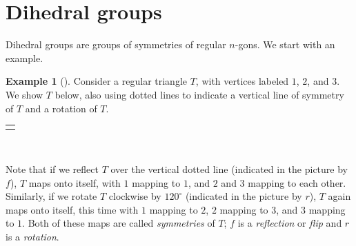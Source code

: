 \documentclass[10pt,openany,oneside]{book}
\theoremstyle{plain}
\theoremstyle{definition}
\theoremstyle{definition}
\theoremstyle{definition}
\newtheorem{example}[theorem]{Example}
\theoremstyle{definition}
\numberwithin{equation}{section}
\newlength{\panelmax}
\begin{document}
\section[{Dihedral groups}]{Dihedral groups}\label{dihedralgps}
Dihedral groups are groups of symmetries of regular \(n\)-gons. We start with an example.%
\begin{example}[]\label{D3}
Consider a regular triangle \(T\), with vertices labeled \(1\), \(2\), and \(3\). We show \(T\) below, also using dotted lines to indicate a vertical line of symmetry of \(T\) and a rotation of \(T\).%
{%
\setlength{\panelmax}{0pt}
\newsavebox{\panelboxFimage}
\begin{lrbox}{\panelboxFimage}
\end{lrbox}
\newlength{\phFimage}\setlength{\phFimage}{\ht\panelboxFimage+\dp\panelboxFimage}
\settototalheight{\phFimage}{\usebox{\panelboxFimage}}
\setlength{\panelmax}{\maxof{\panelmax}{\phFimage}}
\leavevmode%
\setlength{\tabcolsep}{0\linewidth}
\par\medskip\noindent
\hspace*{0.4\linewidth}%
\begin{tabular}{@{}*{1}{c}@{}}
\begin{minipage}[c][\panelmax][t]{0.2\linewidth}\usebox{\panelboxFimage}\end{minipage}\end{tabular}\\
}%
\par
Note that if we reflect \(T\) over the vertical dotted line (indicated in the picture by \(f\)), \(T\) maps onto itself, with \(1\) mapping to \(1\), and \(2\) and \(3\) mapping to each other. Similarly, if we rotate \(T\) clockwise by \(120^{\circ}\) (indicated in the picture by \(r\)), \(T\) again maps onto itself, this time with \(1\) mapping to \(2\), \(2\) mapping to \(3\), and \(3\) mapping to \(1\). Both of these maps are called \emph{symmetries} of \(T\); \(f\) is a \emph{reflection} or \emph{flip} and \(r\) is a \emph{rotation}.%

\end{example}
\end{document}
